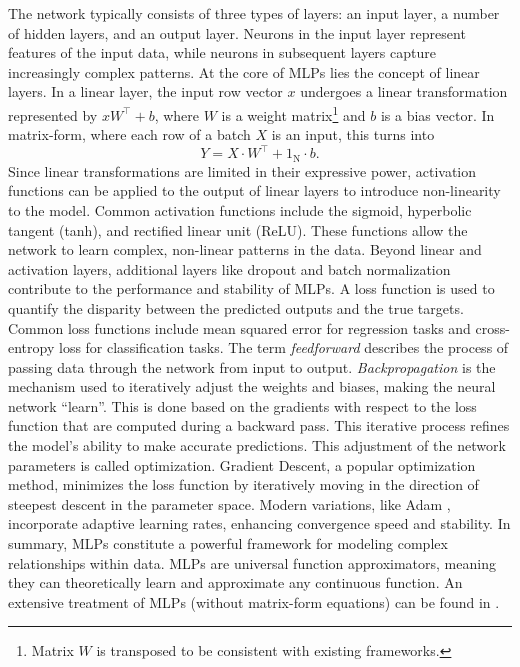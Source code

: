 \documentclass[twoside,11pt]{article}
\newcommand{\const}[1]{\ensuremath{\mathrm{#1}}} %
\begin{document}
The network typically consists of three types of layers: an input layer, a number of hidden layers, and an output layer. Neurons in the input layer represent features of the input data, while neurons in subsequent layers capture increasingly complex patterns.
At the core of MLPs lies the concept of linear layers. In a linear layer, the input row vector $x$ undergoes a linear transformation represented by  $x W^\top + b$, where $W$ is a weight matrix\footnote{Matrix $W$ is transposed to be consistent with existing frameworks.} and $b$ is a bias vector.
In matrix-form, where each row of a batch $X$ is an input, this turns into
\begin{equation} \label{eq:linear-layer-feedforward}
    Y = X \cdot W^{\top} + 1_\const{N} \cdot b.
\end{equation}
Since linear transformations are limited in their expressive power, activation functions \citep{DBLP:journals/ijon/DubeySC22} can be applied to the output of linear layers to introduce non-linearity to the model. Common activation functions include the sigmoid, hyperbolic tangent (tanh), and rectified linear unit (ReLU). These functions allow the network to learn complex, non-linear patterns in the data.
Beyond linear and activation layers, additional layers like dropout and batch normalization contribute to the performance and stability of MLPs. 
A loss function is used to quantify the disparity between the predicted outputs and the true targets. Common loss functions include mean squared error for regression tasks and cross-entropy loss for classification tasks.
The term \textit{feedforward} describes the process of passing data through the network from input to output. \textit{Backpropagation} \citep{kelley1960gradient} is the mechanism used to iteratively adjust the weights and biases, making the neural network ``learn''. This is done based on the gradients with respect to the loss function that are computed during a backward pass. This iterative process refines the model's ability to make accurate predictions.
This adjustment of the network parameters is called optimization. Gradient Descent, a popular optimization method, minimizes the loss function by iteratively moving in the direction of steepest descent in the parameter space. Modern variations, like Adam \citep{DBLP:journals/corr/KingmaB14}, incorporate adaptive learning rates, enhancing convergence speed and stability.
In summary, MLPs constitute a powerful framework for modeling complex relationships within data. 
MLPs are universal function approximators, meaning they can theoretically learn and approximate any continuous function. An extensive treatment of MLPs (without matrix-form equations) can be found in
\citep{zhang2024dive}.
\end{document}
